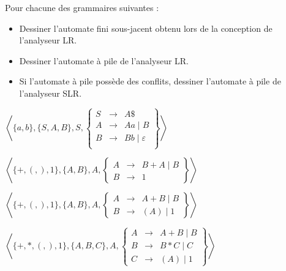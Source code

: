 
\begingroup

\begin{exercice}\label{exo:parsing/decidability/revision}

  Pour chacune des grammaires suivantes :
  \begin{itemize}
  \item Dessiner l'automate fini sous-jacent obtenu lors de la conception de l'analyseur LR.
  \item Dessiner l'automate à pile de l'analyseur LR.
  \item Si l'automate à pile possède des conflits, dessiner l'automate à pile de l'analyseur SLR.
  \end{itemize}

  \begin{questions}
  \item $\left\langle \{a, b\}, \{S, A, B\}, S,
    \left\{\begin{array}{lll}
    S   &\rightarrow& A \$\\
    A   &\rightarrow& Aa \mid  B\\
    B   &\rightarrow& Bb \mid  \varepsilon\\
    \end{array}\right\}\right\rangle$

  \item $\left\langle \{ +, (, ), 1\}, \{A, B\}, A,
    \left\{\begin{array}{lll}
    A   &\rightarrow& B + A \mid B \\
    B   &\rightarrow& 1
    \end{array}\right\}\right\rangle$

  \item $\left\langle \{ +, (, ), 1\}, \{A, B\}, A,
    \left\{\begin{array}{lll}
    A   &\rightarrow& A + B \mid B \\
    B   &\rightarrow& (A) \mid 1
    \end{array}\right\}\right\rangle$

  \item $\left\langle \{ +, *, (, ), 1\}, \{A, B, C\}, A,
    \left\{\begin{array}{lll}
    A   &\rightarrow& A + B \mid  B \\
    B   &\rightarrow& B * C \mid C \\
    C   &\rightarrow& (A) \mid 1
    \end{array}\right\}\right\rangle$

    
  \end{questions}

\end{exercice}

